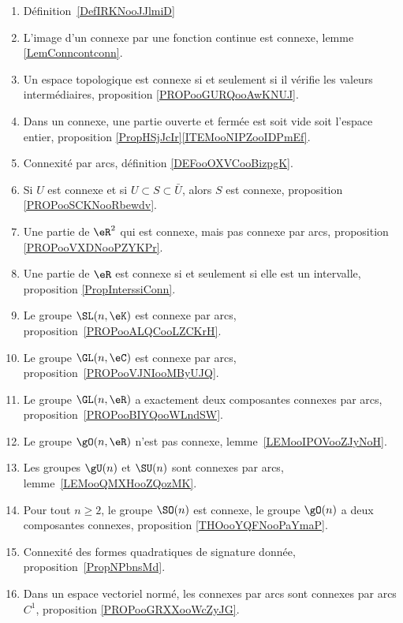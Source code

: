 \begin{enumerate}
	\item
	      Définition~\ref{DefIRKNooJJlmiD}
	\item
	      L'image d'un connexe par une fonction continue est connexe, lemme \ref{LemConncontconn}.
	\item
	      Un espace topologique est connexe si et seulement si il vérifie les valeurs intermédiaires, proposition \ref{PROPooGURQooAwKNUJ}.
	\item
	      Dans un connexe, une partie ouverte et fermée est soit vide soit l'espace entier, proposition \ref{PropHSjJcIr}\ref{ITEMooNIPZooIDPmEf}.
	\item
	      Connexité par arcs, définition \ref{DEFooOXVCooBizpgK}.
	\item
	      Si \( U\) est connexe et si \( U\subset S\subset \bar U\), alors \( S\) est connexe, proposition \ref{PROPooSCKNooRbewdv}.
	\item
	      Une partie de \( \eR^2\) qui est connexe, mais pas connexe par arcs, proposition \ref{PROPooVXDNooPZYKPr}.
	\item
	      Une partie de \( \eR\) est connexe si et seulement si elle est un intervalle, proposition \ref{PropInterssiConn}.
	\item
	      Le groupe \( \SL(n,\eK)\) est connexe par arcs, proposition~\ref{PROPooALQCooLZCKrH}.
	\item
	      Le groupe \( \GL(n,\eC)\) est connexe par arcs, proposition~\ref{PROPooVJNIooMByUJQ}.
	\item
	      Le groupe \( \GL(n,\eR)\) a exactement deux composantes connexes par arcs, proposition~\ref{PROPooBIYQooWLndSW}.
	\item
	      Le groupe \( \gO(n,\eR)\) n'est pas connexe, lemme~\ref{LEMooIPOVooZJyNoH}.
	\item
	      Les groupes \( \gU(n)\) et \( \SU(n)\) sont connexes par arcs, lemme~\ref{LEMooQMXHooZQozMK}.
	\item
	      Pour tout \( n\geq 2\), le groupe \( \SO(n)\) est connexe, le groupe \( \gO(n)\) a deux composantes connexes, proposition \ref{THOooYQFNooPaYmaP}.
	\item
	      Connexité des formes quadratiques de signature donnée, proposition~\ref{PropNPbnsMd}.
	\item
	      Dans un espace vectoriel normé, les connexes par arcs sont connexes par arcs \( C^1\), proposition \ref{PROPooGRXXooWcZyJG}.
\end{enumerate}
